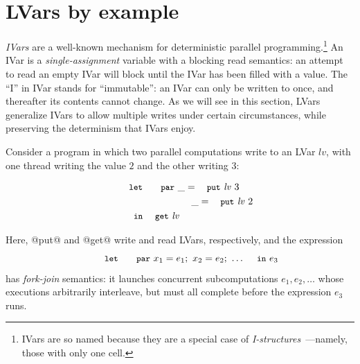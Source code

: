 \section{LVars by example}\label{s:lvars-examples}

\emph{IVars} \cite{IStructures, id, monad-par} are a well-known
mechanism for deterministic parallel programming.\footnote{IVars are
  so named because they are a special case of
  \emph{I-structures}~\cite{IStructures}---namely, those with only one
  cell.}  An IVar is a \emph{single-assignment} variable
\cite{Tesler-1968} with a blocking read semantics: an attempt to read
an empty IVar will block until the IVar has been filled with a value.
The ``I'' in IVar stands for ``immutable'': an IVar can only be
written to once, and thereafter its contents cannot change.  As we
will see in this section, LVars generalize IVars to allow multiple
writes under certain circumstances, while preserving the determinism
that IVars enjoy.

Consider a program in which two
parallel computations write to an LVar $\mathit{lv}$, with one thread
writing the value $2$ and the other writing $3$:

\vspace{-8mm}
\singlespacing
\begin{equation}
\begin{split}
& \LETPAR ~\_ = \putexp{\mathit{lv}}{3} \\
&  \letparspace ~\_ = \putexp{\mathit{lv}}{2} \\
&  \letspace \IN~ \GET~\mathit{lv}
\end{split}
\label{e:lvar-example-1}
\end{equation}
\doublespacing

Here, @put@ and @get@ write and read LVars, respectively, and the
expression
%
\vspace{-8mm}
\singlespacing
\begin{displaymath}
\letparexp{x_1}{e_1}{x_2}{e_2;~\dots}{e_3}
\end{displaymath}
\doublespacing
%
has \emph{fork-join} semantics: it launches concurrent subcomputations
$e_1, e_2, \dots$ whose executions arbitrarily interleave, but must
all complete before the expression $e_3$ runs.

